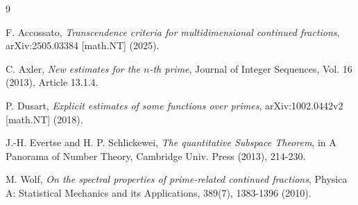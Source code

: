 \documentclass[11pt,a4paper]{article}
\theoremstyle{definition}
\theoremstyle{remark}
\begin{document}
\begin{thebibliography}{9}

F. Accossato,
\textit{Transcendence criteria for multidimensional continued fractions},
arXiv:2505.03384 [math.NT] (2025).

C. Axler,
\textit{New estimates for the $n$-th prime},
Journal of Integer Sequences, Vol. 16 (2013), Article 13.1.4.

P. Dusart,
\textit{Explicit estimates of some functions over primes},
arXiv:1002.0442v2 [math.NT] (2018).

J.-H. Evertse and H. P. Schlickewei,
\textit{The quantitative Subspace Theorem}, in A Panorama of Number Theory, Cambridge Univ. Press (2013), 214-230.

M. Wolf,
\textit{On the spectral properties of prime-related continued fractions},
Physica A: Statistical Mechanics and its Applications, 389(7), 1383-1396 (2010).

\end{thebibliography}
\end{document}

